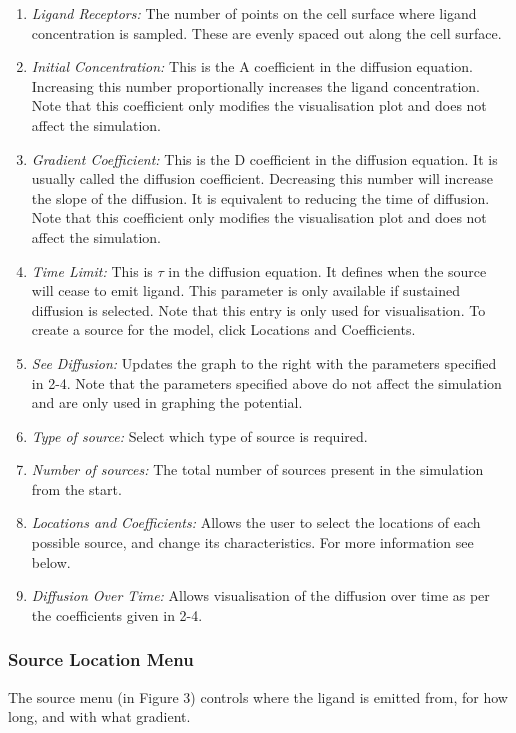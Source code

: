 \documentclass[12pt]{article}
\begin{document}
{\fontsize{9pt}{9pt}
\begin{enumerate}[topsep=2pt,itemsep=-1ex,partopsep=1ex,parsep=1ex]
  \item {\itshape Ligand Receptors:} 
      The number of points on the cell 
  surface where ligand concentration is sampled. These are evenly spaced 
  out along the cell surface.
  \item {\itshape Initial Concentration:} This is the A coefficient in the 
  diffusion equation. Increasing this number proportionally increases the 
  ligand concentration. Note that this coefficient only modifies the 
  visualisation plot and does not affect the simulation.
  \item {\itshape Gradient Coefficient: }This is the D coefficient in the 
  diffusion equation. It is usually called the diffusion coefficient. 
  Decreasing this number will increase the slope of the diffusion. It is 
  equivalent to reducing the time of diffusion. Note that this coefficient 
  only modifies the visualisation plot and does not affect the simulation.
\item {\itshape Time Limit:} This is \(\tau\) in the diffusion equation. 
  It defines when the source will cease to emit ligand. This parameter 
  is only available if sustained diffusion is selected. Note that this 
  entry is only used for visualisation. To create a source for the model,
  click Locations and Coefficients.
  \item {\itshape See Diffusion:} Updates the graph to the right with the 
  parameters specified in 2-4. Note that the parameters specified above do 
  not affect the simulation and are only used in graphing the potential.
  \item {\itshape Type of source:} Select which type of source is 
  required.
  \item {\itshape Number of sources: }The total number of sources present 
  in the simulation from the start.
  \item {\itshape Locations and Coefficients: }Allows the user to select 
  the locations of each possible source, and change its characteristics. 
  For more information see below.
  \item {\itshape Diffusion Over Time:} Allows visualisation of the 
  diffusion over time as per the coefficients given in 2-4.
\end{enumerate}
}

\subsubsection{Source Location Menu}
The source menu (in Figure 3) controls where the ligand is emitted 
from, for how long, and with what gradient.
\end{document}
